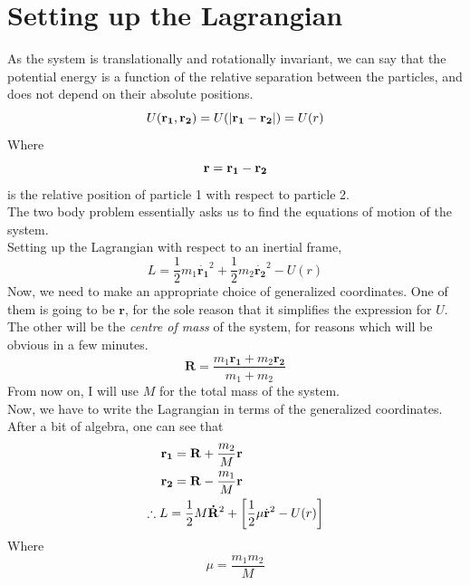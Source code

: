 \documentclass[12pt, letterpaper]{article}
\begin{document}
\section{Setting up the Lagrangian}
As the system is translationally and rotationally invariant, we can say that the potential energy is a function of the relative separation between the particles, and does not depend on their 
absolute positions.
\begin{equation}
    U(\mathbf{r_1},\mathbf{r_2}) = U(|\mathbf{r_1}-\mathbf{r_2}|)=U(r) \notag
\end{equation}
Where 
\begin{equation}
    \mathbf{r}=\mathbf{r_1}-\mathbf{r_2} \notag
\end{equation}
is the relative position of particle 1 with respect to particle 2. \\
The two body problem essentially asks us to find the equations of motion of the system. \\
Setting up the Lagrangian with respect to an inertial frame,
\begin{equation}
    L = \frac{1}{2}m_1\dot{\mathbf{r_1}}^2+\frac{1}{2}m_2\dot{\mathbf{r_2}}^2-U(r)
\end{equation}
Now, we need to make an appropriate choice of generalized coordinates. One of them is going to be $\mathbf{r}$, for the sole reason that
it simplifies the expression for $U$. The other will be the \textit{centre of mass} of the system, for reasons which will be obvious in a few minutes.
\begin{equation}
    \mathbf{R}=\frac{m_1\mathbf{r_1}+m_2\mathbf{r_2}}{m_1+m_2}
\end{equation}
From now on, I will use $M$ for the total mass of the system.\\
Now, we have to write the Lagrangian in terms of the generalized coordinates. After a bit of algebra, one can see that 
\begin{align}
    \mathbf{r_1}=\mathbf{R}+\frac{m_2}{M}\mathbf{r}\hspace{2.25cm}\notag\\
    \mathbf{r_2}=\mathbf{R}-\frac{m_1}{M}\mathbf{r}\hspace{2.25cm}\notag\\
    \therefore L = \frac{1}{2}M\mathbf{\dot{R}}^2 + \left[\frac{1}{2}\mu\dot{\mathbf{r}}^2-U(r)\right]
\end{align}
Where 
\begin{equation}
    \mu = \frac{m_1m_2}{M}
\end{equation}
\end{document}
